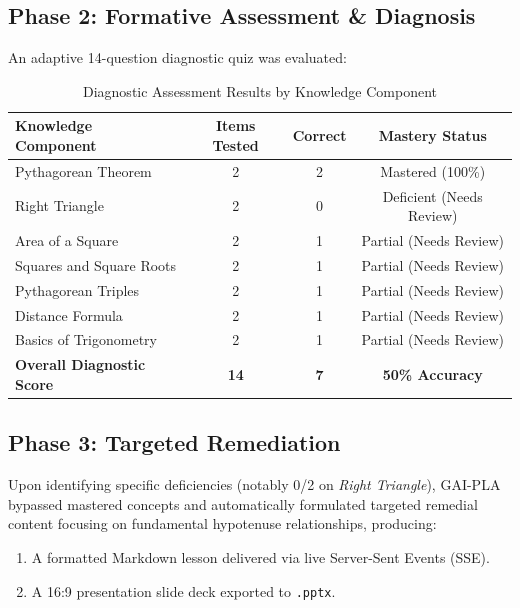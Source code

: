 \documentclass[12pt,a4paper]{article}
\begin{document}
\subsection{Phase 2: Formative Assessment \& Diagnosis}
An adaptive 14-question diagnostic quiz was evaluated:
\begin{table}[htbp]
\centering
\caption{Diagnostic Assessment Results by Knowledge Component}
\label{tab:eval_results}
\begin{tabular}{lccc}
\toprule
\textbf{Knowledge Component} & \textbf{Items Tested} & \textbf{Correct} & \textbf{Mastery Status} \\
\midrule
Pythagorean Theorem & 2 & 2 & Mastered (100\%) \\
Right Triangle & 2 & 0 & Deficient (Needs Review) \\
Area of a Square & 2 & 1 & Partial (Needs Review) \\
Squares and Square Roots & 2 & 1 & Partial (Needs Review) \\
Pythagorean Triples & 2 & 1 & Partial (Needs Review) \\
Distance Formula & 2 & 1 & Partial (Needs Review) \\
Basics of Trigonometry & 2 & 1 & Partial (Needs Review) \\
\midrule
\textbf{Overall Diagnostic Score} & \textbf{14} & \textbf{7} & \textbf{50\% Accuracy} \\
\bottomrule
\end{tabular}
\end{table}

\subsection{Phase 3: Targeted Remediation}
Upon identifying specific deficiencies (notably 0/2 on \textit{Right Triangle}), GAI-PLA bypassed mastered concepts and automatically formulated targeted remedial content focusing on fundamental hypotenuse relationships, producing:
\begin{enumerate}
    \item A formatted Markdown lesson delivered via live Server-Sent Events (SSE).
    \item A 16:9 presentation slide deck exported to \texttt{.pptx}.
\end{enumerate}

\end{document}
